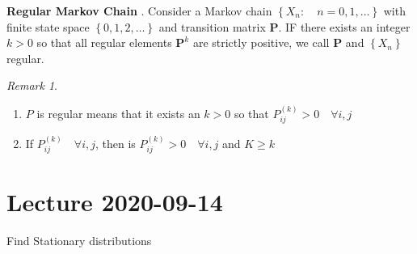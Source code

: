 \documentclass{article}
\theoremstyle{remark}
\newtheorem*{remark}{Remark}
\begin{document}
\begin{definition}
  \textbf{Regular Markov Chain} . Consider a Markov chain $\left\{ X_{n}: \quad  n = 0,1,\ldots  \right\}$ with finite state space $ \left\{ 0,1,2, \ldots \right\}$ and transition matrix $\mathbf{P}$. IF there exists an integer $k >0$ so that all regular elements $\mathbf{P}^{k}$ are strictly positive, we call $\mathbf{P}$ and $\left\{ X_{n} \right\}$ regular. 
\end{definition}

\begin{remark}
   \begin{enumerate}
     \item $P$ is regular means that it exists an $k > 0$ so that $P^{(k)} _{ ij} > 0 \quad  \forall i,j $
     \item  If $P^{(k)} _{ij} \quad  \forall i,j $, then is $P^{(k)} _{ij} > 0 \quad  \forall i,j $ and $K \ge k$ 
   \end{enumerate}
\end{remark}

\newpage
\section{Lecture 2020-09-14}%
\label{sec:lecture_2020_09_14}

Find Stationary distributions
\end{document}
